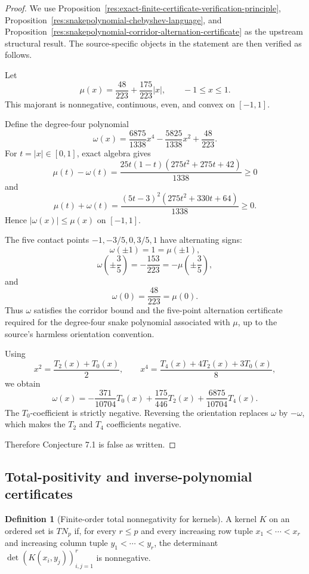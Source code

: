 \documentclass[11pt]{article}
\numberwithin{equation}{section}
\theoremstyle{definition}
\newtheorem{definition}{Definition}[section]
\theoremstyle{remark}
\newcommand{\1}{\mathbf 1}
\begin{document}
\begin{proof}
We use Proposition~\ref{res:exact-finite-certificate-verification-principle}, Proposition~\ref{res:snakepolynomial-chebyshev-language}, and Proposition~\ref{res:snakepolynomial-corridor-alternation-certificate} as the upstream structural result. The source-specific objects in the statement are then verified as follows.

Let
\[
\mu(x)=\frac{48}{223}+\frac{175}{223}|x|,
\qquad -1\le x\le1.
\]
This majorant is nonnegative, continuous, even, and convex on \([-1,1]\).

Define the degree-four polynomial
\[
\omega(x)=
\frac{6875}{1338}x^4-\frac{5825}{1338}x^2+\frac{48}{223}.
\]
For \(t=|x|\in[0,1]\), exact algebra gives
\[
\mu(t)-\omega(t)
=
\frac{25t(1-t)(275t^2+275t+42)}{1338}\ge0
\]
and
\[
\mu(t)+\omega(t)
=
\frac{(5t-3)^2(275t^2+330t+64)}{1338}\ge0.
\]
Hence \(|\omega(x)|\le \mu(x)\) on \([-1,1]\).

The five contact points \(-1,-3/5,0,3/5,1\) have alternating signs:
\[
\omega(\pm1)=1=\mu(\pm1),
\]
\[
\omega\!\left(\pm\frac35\right)=-\frac{153}{223}
=-\mu\!\left(\pm\frac35\right),
\]
and
\[
\omega(0)=\frac{48}{223}=\mu(0).
\]
Thus \(\omega\) satisfies the corridor bound and the five-point alternation certificate required for the degree-four snake polynomial associated with \(\mu\), up to the source's harmless orientation convention.

Using
\[
x^2=\frac{T_2(x)+T_0(x)}2,\qquad
x^4=\frac{T_4(x)+4T_2(x)+3T_0(x)}8,
\]
we obtain
\[
\omega(x)=
-\frac{371}{10704}T_0(x)
+\frac{175}{446}T_2(x)
+\frac{6875}{10704}T_4(x).
\]
The \(T_0\)-coefficient is strictly negative. Reversing the orientation replaces \(\omega\) by \(-\omega\), which makes the \(T_2\) and \(T_4\) coefficients negative.

Therefore Conjecture 7.1 is false as written.
\end{proof}

\subsection{Total-positivity and inverse-polynomial certificates}

\begin{definition}[Finite-order total nonnegativity for kernels]
\label{res:tnkernel-finiteorder}
A kernel \(K\) on an ordered set is \(TN_p\) if, for every \(r\le p\) and every increasing row tuple \(x_1<\cdots<x_r\) and increasing column tuple \(y_1<\cdots<y_r\), the determinant \(\det(K(x_i,y_j))_{i,j=1}^r\) is nonnegative.
\end{definition}
\end{document}
